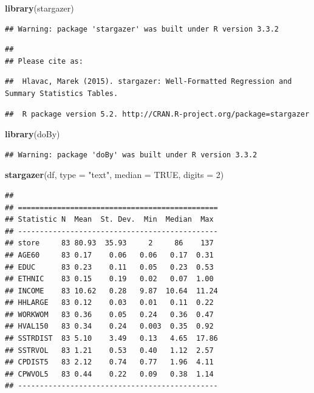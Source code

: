 \documentclass[]{article}
\newenvironment{Shaded}{\begin{snugshade}}{\end{snugshade}}
\newcommand{\KeywordTok}[1]{\textcolor[rgb]{0.13,0.29,0.53}{\textbf{{#1}}}}
\newcommand{\DataTypeTok}[1]{\textcolor[rgb]{0.13,0.29,0.53}{{#1}}}
\newcommand{\DecValTok}[1]{\textcolor[rgb]{0.00,0.00,0.81}{{#1}}}
\newcommand{\StringTok}[1]{\textcolor[rgb]{0.31,0.60,0.02}{{#1}}}
\newcommand{\OtherTok}[1]{\textcolor[rgb]{0.56,0.35,0.01}{{#1}}}
\newcommand{\NormalTok}[1]{{#1}}
\begin{document}
\begin{Shaded}
\begin{Highlighting}[]
\KeywordTok{library}\NormalTok{(stargazer)}
\end{Highlighting}
\end{Shaded}

\begin{verbatim}
## Warning: package 'stargazer' was built under R version 3.3.2
\end{verbatim}

\begin{verbatim}
## 
## Please cite as:
\end{verbatim}

\begin{verbatim}
##  Hlavac, Marek (2015). stargazer: Well-Formatted Regression and Summary Statistics Tables.
\end{verbatim}

\begin{verbatim}
##  R package version 5.2. http://CRAN.R-project.org/package=stargazer
\end{verbatim}

\begin{Shaded}
\begin{Highlighting}[]
\KeywordTok{library}\NormalTok{(doBy)}
\end{Highlighting}
\end{Shaded}

\begin{verbatim}
## Warning: package 'doBy' was built under R version 3.3.2
\end{verbatim}

\begin{Shaded}
\begin{Highlighting}[]
\KeywordTok{stargazer}\NormalTok{(df, }\DataTypeTok{type =} \StringTok{"text"}\NormalTok{, }\DataTypeTok{median =} \OtherTok{TRUE}\NormalTok{, }\DataTypeTok{digits =} \DecValTok{2}\NormalTok{)}
\end{Highlighting}
\end{Shaded}

\begin{verbatim}
## 
## ==============================================
## Statistic N  Mean  St. Dev.  Min  Median  Max 
## ----------------------------------------------
## store     83 80.93  35.93     2     86    137 
## AGE60     83 0.17    0.06   0.06   0.17  0.31 
## EDUC      83 0.23    0.11   0.05   0.23  0.53 
## ETHNIC    83 0.15    0.19   0.02   0.07  1.00 
## INCOME    83 10.62   0.28   9.87  10.64  11.24
## HHLARGE   83 0.12    0.03   0.01   0.11  0.22 
## WORKWOM   83 0.36    0.05   0.24   0.36  0.47 
## HVAL150   83 0.34    0.24   0.003  0.35  0.92 
## SSTRDIST  83 5.10    3.49   0.13   4.65  17.86
## SSTRVOL   83 1.21    0.53   0.40   1.12  2.57 
## CPDIST5   83 2.12    0.74   0.77   1.96  4.11 
## CPWVOL5   83 0.44    0.22   0.09   0.38  1.14 
## ----------------------------------------------
\end{verbatim}
\end{document}
